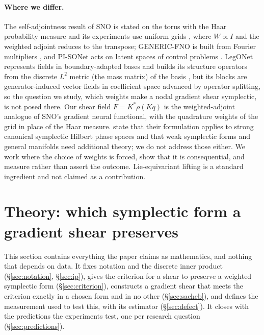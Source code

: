\documentclass[11pt]{article}
\theoremstyle{definition}
\theoremstyle{remark}
\begin{document}
\paragraph{Where we differ.} The self-adjointness result of SNO is stated on the
torus with the Haar probability measure and its experiments use uniform grids
\citep{makara2026sno}, where $W\propto I$ and the weighted adjoint reduces to the
transpose; GENERIC-FNO is built from Fourier multipliers
\citep{sulskis2026generic}, and PI-SONet acts on latent spaces of control
problems \citep{varghese2026pisonet}. LegONet represents fields in
boundary-adapted bases and builds its structure operators from the discrete
$L^2$ metric (the mass matrix) of the basis \citep{zhang2026legonet}, but its
blocks are generator-induced vector fields in coefficient space advanced by
operator splitting, so the question we study, which weights make a nodal gradient
shear symplectic, is not posed there. Our shear field $F=K^{*}\rho(Kq)$ is the
weighted-adjoint analogue of SNO's gradient neural functional, with the
quadrature weights of the grid in place of the Haar measure.
\citet{makara2026sno} state that their formulation applies to strong canonical
symplectic Hilbert phase spaces and that weak symplectic forms and general
manifolds need additional theory; we do not address those either. We work where
the choice of weights is forced, show that it is consequential, and measure
rather than assert the outcome. Lie-equivariant lifting
\citep{finzi2020lieconv} is a standard ingredient and not claimed as a
contribution.

\section{Theory: which symplectic form a gradient shear preserves}
\label{sec:background}

This section contains everything the paper claims as mathematics, and
nothing that depends on data. It fixes notation and the discrete inner product
(\S\ref{sec:notation}, \S\ref{sec:ip}), gives the criterion for a shear to
preserve a weighted symplectic form (\S\ref{sec:criterion}), constructs a
gradient shear that meets the criterion exactly in a chosen form and in no other
(\S\ref{sec:sacheb}), and defines the measurement used to test this, with its
estimator (\S\ref{sec:defect}). It closes with the predictions the experiments
test, one per research question (\S\ref{sec:predictions}).
\end{document}
